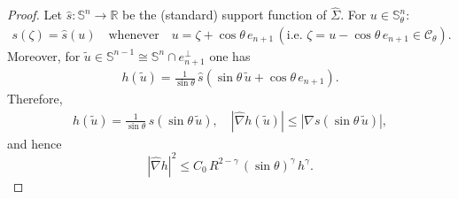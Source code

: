 \documentclass[10pt,a4paper]{amsart}
\newcommand{\bbR}{\mathbb{R}}
\newcommand{\bbS}{\mathbb{S}}
\newcommand{\cC}{\mathcal{C}}
\newcommand{\eq}[1]{\begin{equation}\begin{alignedat}{2}#1\end{alignedat}\end{equation}}
\newcommand{\wh}{\widehat}
\begin{document}
\begin{proof}
Let $\hat{s}:\bbS^n\to\bbR$ be the (standard) support function of $\widehat{\Sigma}$.
For $u\in\bbS^n_\theta$:
\eq{
s(\zeta)=\hat{s}(u)
\quad\text{whenever}\quad
u=\zeta+\cos\theta\,e_{n+1}
\, (\text{i.e.\ }\zeta=u-\cos\theta\,e_{n+1}\in\cC_\theta).
}
Moreover, for $\tilde u\in\bbS^{n-1}\cong \bbS^n\cap e_{n+1}^\perp$ one has
\eq{\label{eq:omega-support}
h(\tilde u)
=
\frac{1}{\sin\theta}\,\hat{s}(\sin\theta\,\tilde u+\cos\theta\,e_{n+1}).
}
Therefore,
\eq{\label{eq:omega-support-via-s}
h(\tilde u)
=
\frac{1}{\sin\theta}\,s(\sin\theta\,\tilde u), \quad
|\wh{\nabla}h(\tilde u)|
\le
|\nabla s(\sin\theta\,\tilde u)|,
}
and hence
\[
|\wh{\nabla}h|^2
\le
C_0\,R^{2-\gamma}\,(\sin\theta)^\gamma\,h^\gamma.
\]
\end{proof}
\end{document}
